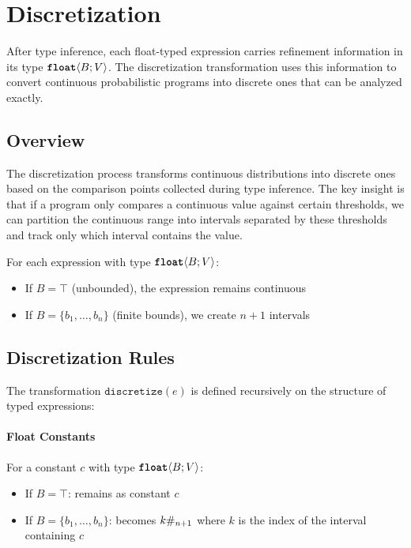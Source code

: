 \section{Discretization}\label{sec:discretization}

After type inference, each float-typed expression carries refinement information in its type $\text{\ttfamily\bfseries float}\langle B; V \rangle$. The discretization transformation uses this information to convert continuous probabilistic programs into discrete ones that can be analyzed exactly.

\subsection{Overview}

The discretization process transforms continuous distributions into discrete ones based on the comparison points collected during type inference. The key insight is that if a program only compares a continuous value against certain thresholds, we can partition the continuous range into intervals separated by these thresholds and track only which interval contains the value.

For each expression with type $\text{\ttfamily\bfseries float}\langle B; V \rangle$:
\begin{itemize}
    \item If $B = \top$ (unbounded), the expression remains continuous
    \item If $B = \{b_1, \ldots, b_n\}$ (finite bounds), we create $n+1$ intervals
\end{itemize}

\subsection{Discretization Rules}

The transformation $\texttt{discretize}(e)$ is defined recursively on the structure of typed expressions:

\paragraph{Float Constants} For a constant $c$ with type $\text{\ttfamily\bfseries float}\langle B; V \rangle$:
\begin{itemize}
    \item If $B = \top$: remains as constant $c$
    \item If $B = \{b_1, \ldots, b_n\}$: becomes $k\#_{n+1}$ where $k$ is the index of the interval containing $c$
\end{itemize}

